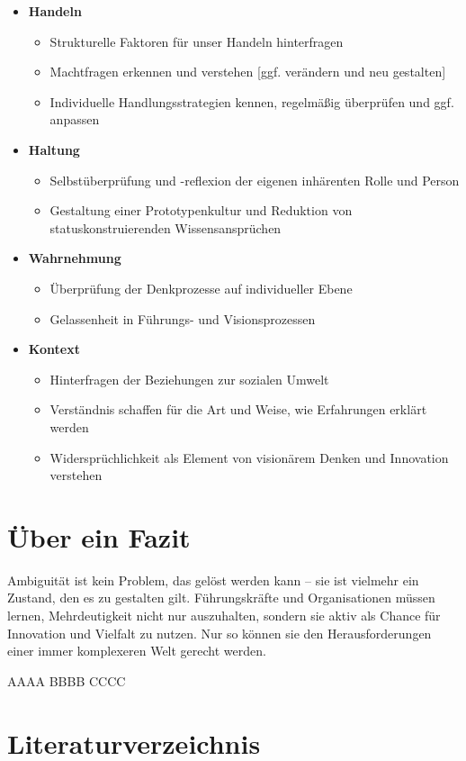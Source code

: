 \documentclass[
  ngerman,
  letterpaper,
  DIV=11]{scrartcl}
\providecommand{\tightlist}{%
  \setlength{\itemsep}{0pt}\setlength{\parskip}{0pt}}
\begin{document}
\begin{itemize}
\tightlist
\item
  \textbf{Handeln}

  \begin{itemize}
  \tightlist
  \item
    Strukturelle Faktoren für unser Handeln hinterfragen
  \item
    Machtfragen erkennen und verstehen {[}ggf. verändern und neu
    gestalten{]}
  \item
    Individuelle Handlungsstrategien kennen, regelmäßig überprüfen und
    ggf. anpassen
  \end{itemize}
\item
  \textbf{Haltung}

  \begin{itemize}
  \tightlist
  \item
    Selbstüberprüfung und -reflexion der eigenen inhärenten Rolle und
    Person
  \item
    Gestaltung einer Prototypenkultur und Reduktion von
    statuskonstruierenden Wissensansprüchen
  \end{itemize}
\item
  \textbf{Wahrnehmung}

  \begin{itemize}
  \tightlist
  \item
    Überprüfung der Denkprozesse auf individueller Ebene
  \item
    Gelassenheit in Führungs- und Visionsprozessen
  \end{itemize}
\item
  \textbf{Kontext}

  \begin{itemize}
  \tightlist
  \item
    Hinterfragen der Beziehungen zur sozialen Umwelt
  \item
    Verständnis schaffen für die Art und Weise, wie Erfahrungen erklärt
    werden
  \item
    Widersprüchlichkeit als Element von visionärem Denken und Innovation
    verstehen
  \end{itemize}
\end{itemize}

\section{Über ein Fazit}\label{uxfcber-ein-fazit}

Ambiguität ist kein Problem, das gelöst werden kann -- sie ist vielmehr
ein Zustand, den es zu gestalten gilt. Führungskräfte und Organisationen
müssen lernen, Mehrdeutigkeit nicht nur auszuhalten, sondern sie aktiv
als Chance für Innovation und Vielfalt zu nutzen. Nur so können sie den
Herausforderungen einer immer komplexeren Welt gerecht werden.

AAAA BBBB CCCC

\section{Literaturverzeichnis}\label{literaturverzeichnis}

\printbibliography[heading=none]
\end{document}
